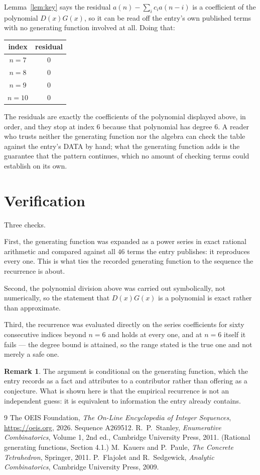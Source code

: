 \documentclass[11pt,a4paper]{article}
\theoremstyle{plain}
\theoremstyle{definition}
\newtheorem{remark}[theorem]{Remark}
\begin{document}
Lemma~\ref{lem:key} says the residual $a(n)-\sum_ic_ia(n-i)$ is a coefficient of the
polynomial $D(x)G(x)$, so it can be read off the entry's own published terms with no
generating function involved at all. Doing that:
\begin{center}
\begin{tabular}{cc}
index & residual \\ \hline
$n=7$ & $0$ \\
$n=8$ & $0$ \\
$n=9$ & $0$ \\
$n=10$ & $0$
\end{tabular}
\end{center}
The residuals are exactly the coefficients of the polynomial displayed above, in order, and
they stop at index $6$ because that polynomial has degree $6$. A reader who trusts
neither the generating function nor the algebra can check the table against the entry's DATA
by hand; what the generating function adds is the guarantee that the pattern continues, which
no amount of checking terms could establish on its own.

\section{Verification}

Three checks.

First, the generating function was expanded as a power series in exact rational arithmetic and
compared against all $46$ terms the entry publishes: it reproduces every one. This is
what ties the recorded generating function to the sequence the recurrence is about.

Second, the polynomial division above was carried out symbolically, not numerically, so the
statement that $D(x)G(x)$ is a polynomial is exact rather than approximate.

Third, the recurrence was evaluated directly on the series coefficients for sixty consecutive
indices beyond $n=6$ and holds at every one, and at $n=6$ itself it fails --- the
degree bound is attained, so the range stated is the true one and not merely a safe one.

\begin{remark}
The argument is conditional on the generating function, which the entry records as a fact and
attributes to a contributor rather than offering as a conjecture. What is shown here is that
the empirical recurrence is not an independent guess: it is equivalent to information the
entry already contains.
\end{remark}

\begin{thebibliography}{9}
 The OEIS Foundation, \emph{The On-Line Encyclopedia of Integer
Sequences}, \url{https://oeis.org}, 2026. Sequence A269512.
 R.~P.~Stanley, \emph{Enumerative Combinatorics}, Volume 1, 2nd ed.,
Cambridge University Press, 2011. (Rational generating functions, Section 4.1.)
 M.~Kauers and P.~Paule, \emph{The Concrete Tetrahedron}, Springer, 2011.
 P.~Flajolet and R.~Sedgewick, \emph{Analytic Combinatorics}, Cambridge
University Press, 2009.
\end{thebibliography}
\end{document}
